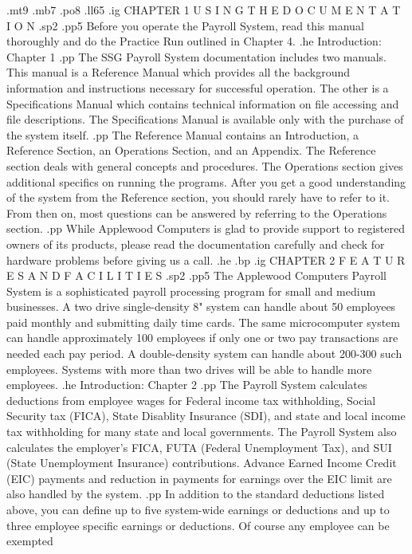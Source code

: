.mt9
.mb7
.po8
.ll65
.ig
CHAPTER 1
U S I N G   T H E   D O C U M E N T A T I O N
.sp2
.pp5
Before you operate the Payroll System, read this manual thoroughly
and do the Practice Run outlined in Chapter 4.
.he Introduction: Chapter 1
.pp
The SSG Payroll System documentation includes two manuals.  This
manual is a Reference Manual which provides all the background information
and instructions necessary for successful operation.  The other is a
Specifications Manual which contains technical information on file accessing
and file descriptions.	The Specifications Manual is available only
with the purchase of the system itself.
.pp
The Reference Manual contains an Introduction, a Reference Section, an
Operations Section, and an Appendix.  The Reference section deals with
general concepts and procedures.  The Operations section gives
additional specifics on running the programs. After you get a good
understanding of the system from the Reference section, you
should rarely have to refer to it.  From then on, most questions can
be answered by referring to the Operations section.
.pp
While Applewood Computers is glad to provide support to
registered owners of its products, please
read the documentation carefully and check for hardware
problems before giving us a call.
.he
.bp
.ig
CHAPTER 2
F E A T U R E S    A N D    F A C I L I T I E S
.sp2
.pp5
The Applewood Computers Payroll System is a sophisticated payroll
processing program for small and medium businesses.  A two drive
single-density 8" system can handle about 50 employees paid monthly
and submitting daily time cards.  The same microcomputer system can
handle approximately 100 employees if only one or two pay transactions
are needed each pay period.  A double-density system can handle about
200-300 such employees.  Systems with more than two drives will
be able to handle more employees.
.he Introduction: Chapter 2
.pp
The Payroll System calculates deductions from employee wages
for Federal income tax withholding, Social Security tax (FICA), State Disablity
Insurance (SDI), and state and local income tax withholding for many state
and local governments.	The Payroll System also calculates the employer's
FICA, FUTA (Federal Unemployment Tax), and SUI (State Unemployment
Insurance) contributions.  Advance Earned Income Credit (EIC) payments
and reduction in payments for earnings over the EIC limit are also
handled by the system.
.pp
In addition to the standard deductions listed above, you can define
up to five system-wide earnings or deductions and up to three employee
specific earnings or deductions.  Of course any employee can be exempted

